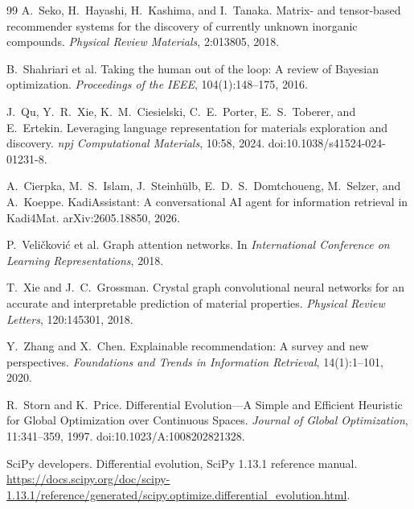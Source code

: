 \documentclass[12pt,a4paper]{article}
\begin{document}
\begin{thebibliography}{99}
 A.~Seko, H.~Hayashi, H.~Kashima, and I.~Tanaka. Matrix- and tensor-based recommender systems for the discovery of currently unknown inorganic compounds. \textit{Physical Review Materials}, 2:013805, 2018.

 B.~Shahriari et al. Taking the human out of the loop: A review of Bayesian optimization. \textit{Proceedings of the IEEE}, 104(1):148--175, 2016.

 J.~Qu, Y.~R.~Xie, K.~M.~Ciesielski, C.~E.~Porter, E.~S.~Toberer, and E.~Ertekin. Leveraging language representation for materials exploration and discovery. \textit{npj Computational Materials}, 10:58, 2024. doi:10.1038/s41524-024-01231-8.

 A.~Cierpka, M.~S.~Islam, J.~Steinh\"{u}lb, E.~D.~S.~Domtchoueng, M.~Selzer, and A.~Koeppe. KadiAssistant: A conversational AI agent for information retrieval in Kadi4Mat. arXiv:2605.18850, 2026.

 P.~Veli\v{c}kovi\'{c} et al. Graph attention networks. In \textit{International Conference on Learning Representations}, 2018.

 T.~Xie and J.~C.~Grossman. Crystal graph convolutional neural networks for an accurate and interpretable prediction of material properties. \textit{Physical Review Letters}, 120:145301, 2018.

 Y.~Zhang and X.~Chen. Explainable recommendation: A survey and new perspectives. \textit{Foundations and Trends in Information Retrieval}, 14(1):1--101, 2020.

 R.~Storn and K.~Price. Differential Evolution---A Simple and Efficient Heuristic for Global Optimization over Continuous Spaces. \textit{Journal of Global Optimization}, 11:341--359, 1997. doi:10.1023/A:1008202821328.

 SciPy developers. Differential evolution, SciPy 1.13.1 reference manual. \url{https://docs.scipy.org/doc/scipy-1.13.1/reference/generated/scipy.optimize.differential_evolution.html}.
\end{thebibliography}
\end{document}
